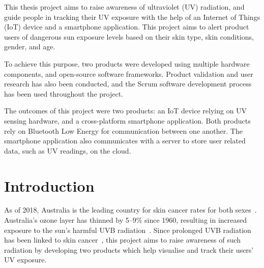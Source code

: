 \documentclass[12pt,openany,a4paper]{book}
\begin{document}
This thesis project aims to raise awareness of ultraviolet (UV) radiation, and
guide people in tracking their UV exposure with the help of an Internet
of Things (IoT) device and a smartphone application. This project aims to alert
product users of dangerous sun exposure levels based on their skin type, skin
conditions, gender, and age.

To achieve this purpose, two products were developed
using multiple hardware components, and open-source software frameworks. Product
validation and user research has also been conducted, and the Scrum software
development process has been used throughout the project.

The outcomes of this project were two products: an IoT device relying on UV
sensing hardware, and a cross-platform smartphone application. Both products
rely on Bluetooth Low Energy for communication between one another. The
smartphone application also communicates with a server to store user related
data, such as UV readings, on the cloud.

\tableofcontents

\listoffigures
{}

\listoftables
{}

% 

\cleardoublepage

\mainmatter


%
%
%
%	
%	

\chapter{Introduction}

As of 2018, Australia is the leading country for skin cancer rates for both
sexes~\cite{bray_2018}. Australia's ozone layer has thinned by 5--9\% since 1960,
resulting in increased exposure to the sun's harmful UVB radiation~\cite{department_ee}.
Since prolonged UVB radiation has been linked to skin cancer~\cite{twenty_one_q}, this
project aims to raise awareness of such radiation by developing two products
which help visualise and track their users' UV exposure.
\end{document}

